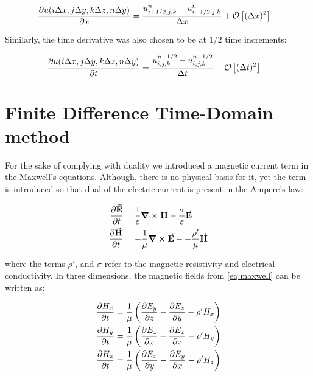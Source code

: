 \documentclass[12pt]{article}
\begin{document}
\begin{align}
  \pdv{u (i \Delta x, j \Delta y, k \Delta z, n \Delta y )}{x} & = \frac{u^n_{i + 1/2, j , k} - u^n_{i - 1/2, j , k}}{\Delta x} + \mathcal{O}\left[(\Delta x)^2\right]
\end{align}

Similarly, the time derivative was also chosen to be at $1/2$ time increments:

\begin{align}
  \pdv{u (i \Delta x, j \Delta y, k \Delta z, n \Delta y )}{t} & = \frac{u^{n + 1/2}_{i , j , k} - u^{n - 1/2}_{i , j , k}}{\Delta t} + \mathcal{O}\left[(\Delta t)^2\right]
\end{align}

\section{Finite Difference Time-Domain method}

For the sake of complying with duality we introduced a magnetic current term in the Maxwell's equations. Although, there is no physical basis for it, yet the term is introduced so that dual of the electric current is present in the Ampere's law:

\begin{subequations}
  \begin{align}
    \pdv{\va{E}}{t} & = \frac{1}{\varepsilon} \curl{\va{H}} - \frac{\sigma}{\varepsilon}  \va{E} \label{eq:faradays}   \\
    \pdv{\va{H}}{t} & = -\frac{1}{\mu} \curl{\va{E}} - - \frac{\rho'}{\mu}  \va{H} \label{eq:ameperes}
  \end{align}
  \label{eq:maxwell}
\end{subequations}

where the terms $\rho'$, and $\sigma$ refer to the magnetic resistivity and electrical conductivity. In three dimensions, the magnetic fields from \eqref{eq:maxwell} can be written as:

\begin{subequations}
  \begin{align}
    \pdv{H_x}{t} & =\frac{1}{\mu}\left(\pdv{E_y}{z}-\pdv{E_z}{y}-\rho' H_{x}\right) \label{eq:H_x_3D} \\
    \pdv{H_y}{t} & =\frac{1}{\mu}\left(\pdv{E_z}{x}-\pdv{E_x}{z}-\rho' H_{y}\right) \label{eq:H_y_3D} \\
    \pdv{H_z}{t} & =\frac{1}{\mu}\left(\pdv{E_x}{y}-\pdv{E_y}{x}-\rho' H_{z}\right) \label{eq:H_z_3D}
  \end{align}
  \label{eq:magnetic}
\end{subequations}
\end{document}
